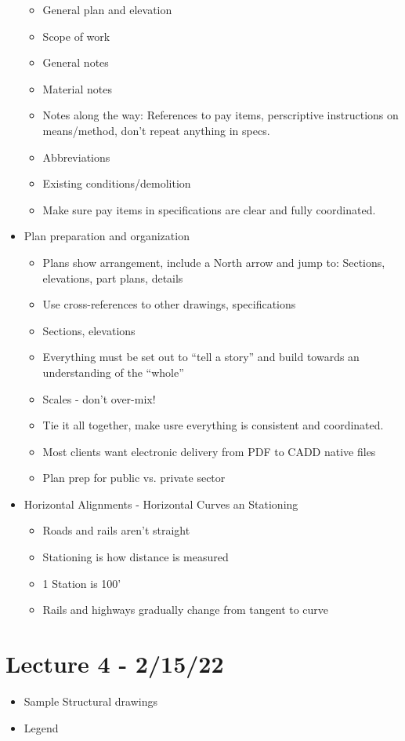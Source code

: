 \documentclass{article}
\begin{document}
\begin{itemize}
\begin{itemize}
        \item General plan and elevation
        \item Scope of work
        \item General notes
        \item Material notes
        \item Notes along the way: References to pay items, perscriptive instructions on means/method, don't repeat anything in specs.
        \item Abbreviations
        \item Existing conditions/demolition
        \item Make sure pay items in specifications are clear and fully coordinated.
    \end{itemize}
    \item Plan preparation and organization
    \begin{itemize}
        \item Plans show arrangement, include a North arrow and jump to: Sections, elevations, part plans, details
        \item Use cross-references to other drawings, specifications
        \item Sections, elevations
        \item Everything must be set out to ``tell a story'' and build towards an understanding of the ``whole''
        \item Scales - don't over-mix!
        \item Tie it all together, make usre everything is consistent and coordinated.
        \item Most clients want electronic delivery from PDF to CADD native files
        \item Plan prep for public vs. private sector
    \end{itemize}
    \item Horizontal Alignments - Horizontal Curves an Stationing
    \begin{itemize}
        \item Roads and rails aren't straight
        \item Stationing is how distance is measured
        \item 1 Station is 100'
        \item Rails and highways gradually change from tangent to curve
    \end{itemize}
\end{itemize}
\section*{Lecture 4 - 2/15/22}
\begin{itemize}
    \item Sample Structural drawings
    \item Legend
\end{itemize}
\end{document}
